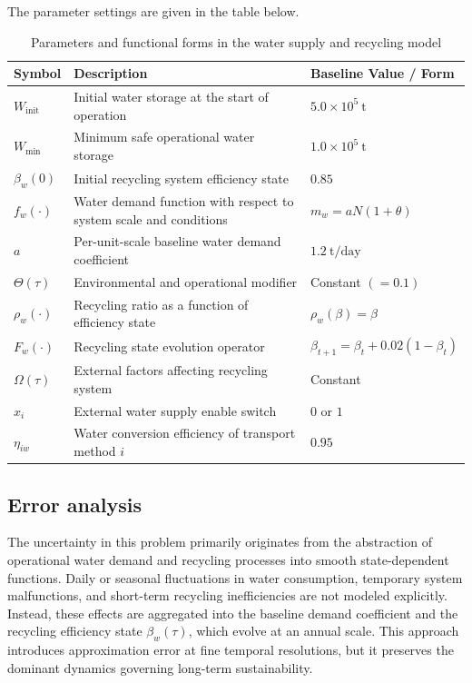 \documentclass[12pt]{article}
\begin{document}
The parameter settings are given in the table below.

\begin{table}[htbp]
\centering
\renewcommand{\arraystretch}{1.2}
\begin{tabular}{lll}
\hline
Symbol & Description & Baseline Value / Form \\
\hline
$W_{\mathrm{init}}$   & Initial water storage at the start of operation                   & $5.0 \times 10^{5}\ \mathrm{t}$ \\
$W_{\min}$            & Minimum safe operational water storage                            & $1.0 \times 10^{5}\ \mathrm{t}$ \\
$\beta_w(0)$          & Initial recycling system efficiency state                         & $0.85$ \\
$f_w(\cdot)$          & Water demand function with respect to system scale and conditions & $m_w = a N (1 + \theta)$ \\
$a$                   & Per-unit-scale baseline water demand coefficient                  & $1.2\ \mathrm{t/day}$ \\
$\Theta(\tau)$        & Environmental and operational modifier                            & Constant $(=0.1)$ \\
$\rho_w(\cdot)$       & Recycling ratio as a function of efficiency state                 & $\rho_w(\beta) = \beta$ \\
$F_w(\cdot)$          & Recycling state evolution operator                                & $\beta_{t+1} = \beta_t + 0.02(1-\beta_t)$ \\
$\Omega(\tau)$        & External factors affecting recycling system                       & Constant \\
$x_i$                 & External water supply enable switch                               & $0$ or $1$ \\
$\eta_{iw}$           & Water conversion efficiency of transport method $i$               & $0.95$ \\
\hline
\end{tabular}
\caption{Parameters and functional forms in the water supply and recycling model}
\label{tab:water_parameters}
\end{table}

\subsection{Error analysis}

The uncertainty in this problem primarily originates from the abstraction of operational water demand and recycling processes into smooth state-dependent functions. Daily or seasonal fluctuations in water consumption, temporary system malfunctions, and short-term recycling inefficiencies are not modeled explicitly. Instead, these effects are aggregated into the baseline demand coefficient and the recycling efficiency state $\beta_w(\tau)$, which evolve at an annual scale. This approach introduces approximation error at fine temporal resolutions, but it preserves the dominant dynamics governing long-term sustainability.
\end{document}

